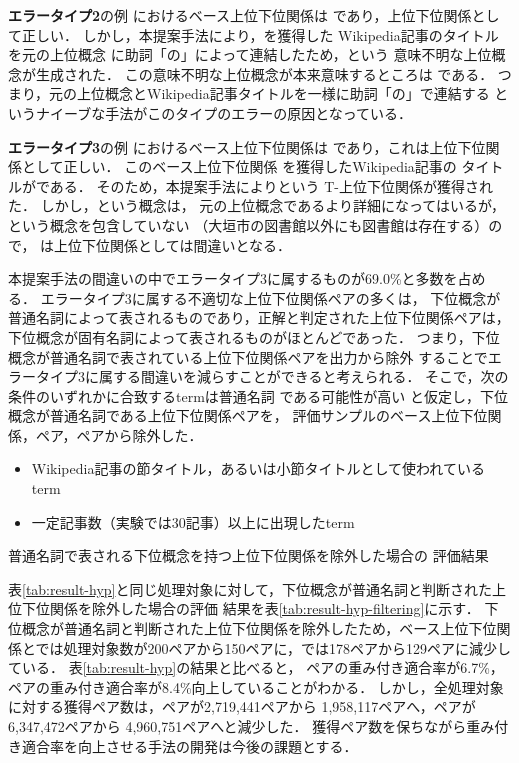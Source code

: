 \documentclass[japanese]{jnlp_1.4}
\newcommand{\thype}{}
\newcommand{\ghype}{}
\newcommand{\xmp}[1]{}
\newcommand{\isa}[2]{}
\begin{document}
\textbf{エラータイプ2}の例
\isa{原山理一郎のアナウンサー}{小林豊}におけるベース上位下位関係は
\isa{アナウンサー}{小林豊}であり，上位下位関係として正しい．
しかし，本提案手法により，\isa{アナウンサー}{小林豊}を獲得した
Wikipedia記事のタイトル\xmp{原山理一郎}を元の上位概念\xmp{アナウンサー}
に助詞「の」によって連結したため，\xmp{原山理一郎のアナウンサー}という
意味不明な上位概念が生成された．
この意味不明な上位概念が本来意味するところは
\xmp{原山理一郎と同期入社のアナウンサー}である．
つまり，元の上位概念とWikipedia記事タイトルを一様に助詞「の」で連結する
というナイーブな手法がこのタイプのエラーの原因となっている．

\textbf{エラータイプ3}の例
\isa{大垣市の公共施設}{図書館}におけるベース上位下位関係は
\isa{公共施設}{図書館}であり，これは上位下位関係として正しい．
このベース上位下位関係
を獲得したWikipedia記事の
タイトルが\xmp{大垣市}である．
そのため，本提案手法により\isa{大垣市の公共施設}{図書館}という
T-上位下位関係が獲得された．
しかし，\xmp{大垣市の公共施設}という概念は，
元の上位概念である\xmp{公共施設}より詳細になってはいるが，
\xmp{図書館}という概念を包含していない
（大垣市の図書館以外にも図書館は存在する）ので，
\isa{大垣市の公共施設}{図書館}は上位下位関係としては間違いとなる．


本提案手法の間違いの中でエラータイプ3に属するものが69.0\%と多数を占める．
エラータイプ3に属する不適切な上位下位関係ペアの多くは，
下位概念が普通名詞によって表されるものであり，正解と判定された上位下位関係ペアは，
下位概念が固有名詞によって表されるものがほとんどであった．
つまり，下位概念が普通名詞で表されている上位下位関係ペアを出力から除外
することでエラータイプ3に属する間違いを減らすことができると考えられる．
そこで，次の条件のいずれかに合致するtermは普通名詞
である可能性が高い
と仮定し，下位概念が普通名詞である上位下位関係ペアを，
評価サンプルのベース上位下位関係，\thype{}ペア，\ghype{}ペアから除外した．

\begin{itemize}
 \item Wikipedia記事の節タイトル，あるいは小節タイトルとして使われているterm
 \item 一定記事数（実験では30記事）以上に出現したterm
\end{itemize}


\begin{table}[b]
\caption{普通名詞で表される下位概念を持つ上位下位関係を除外した場合の
評価結果}
\label{tab:result-hyp-filtering}

\end{table}

表\ref{tab:result-hyp}と同じ処理対象に対して，下位概念が普通名詞と判断された上位下位関係を除外した場合の評価
結果を表\ref{tab:result-hyp-filtering}に示す．
下位概念が普通名詞と判断された上位下位関係を除外したため，ベース上位下位関係と\thype{}では処理対象数が200ペアから150ペアに，\ghype{}では178ペアから129ペアに減少している．
表\ref{tab:result-hyp}の結果と比べると，
\ghype{}ペアの重み付き適合率が6.7\%，
\thype{}ペアの重み付き適合率が8.4\%向上していることがわかる．
しかし，全処理対象に対する獲得ペア数は，\thype{}ペアが2,719,441ペアから
1,958,117ペアへ，\ghype{}ペアが6,347,472ペアから
4,960,751ペアへと減少した．
獲得ペア数を保ちながら重み付き適合率を向上させる手法の開発は今後の課題とする．
\end{document}

